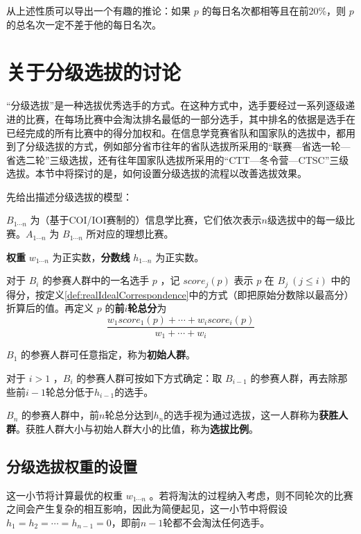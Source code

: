             从上述性质可以导出一个有趣的推论：如果 $p$ 的每日名次都相等且在前20\%，则 $p$ 的总名次一定不差于他的每日名次。

\section{关于分级选拔的讨论}\label{sec:sec6Multilevel}

    “分级选拔”是一种选拔优秀选手的方式。在这种方式中，选手要经过一系列逐级递进的比赛，在每场比赛中会淘汰排名最低的一部分选手，其中排名的依据是选手在已经完成的所有比赛中的得分加权和。在信息学竞赛省队和国家队的选拔中，都用到了分级选拔的方式，例如部分省市往年的省队选拔所采用的“联赛---省选一轮---省选二轮”三级选拔，还有往年国家队选拔所采用的“CTT---冬令营---CTSC”三级选拔。本节中将探讨的是，如何设置分级选拔的流程以改善选拔效果。

    \vspace{1.5ex}

    先给出描述分级选拔的模型：
    \begin{asparaitem}
        \item $B_{1\cdots n}$ 为（基于COI/IOI赛制的）信息学比赛，它们依次表示$n$级选拔中的每一级比赛。$A_{1\cdots n}$ 为 $B_{1\cdots n}$ 所对应的理想比赛。
        \item \textbf{权重} $w_{1\cdots n}$ 为正实数，\textbf{分数线} $h_{1\cdots n}$ 为正实数。
        \item 对于 $B_i$ 的参赛人群中的一名选手 $p$ ，记 $\textit{score}_{j}(p)$ 表示 $p$ 在 $B_j\  (j\leq i)$ 中的得分，按定义\ref{def:realIdealCorrespondence}中的方式（即把原始分数除以最高分）折算后的值。再定义 $p$ 的\textbf{前$i$轮总分}为 $$\frac{w_1\textit{score}_1(p)+\cdots+w_i\textit{score}_i(p)}{w_1+\cdots+w_i}$$
        \item $B_1$ 的参赛人群可任意指定，称为\textbf{初始人群}。
        \item 对于 $i>1$ ，$B_i$ 的参赛人群可按如下方式确定：取 $B_{i-1}$ 的参赛人群，再去除那些前$i-1$轮总分低于$h_{i-1}$的选手。
        \item $B_n$ 的参赛人群中，前$n$轮总分达到$h_n$的选手视为通过选拔，这一人群称为\textbf{获胜人群}。获胜人群大小与初始人群大小的比值，称为\textbf{选拔比例}。
    \end{asparaitem}

    \subsection{分级选拔权重的设置}

        这一小节将计算最优的权重 $w_{1\cdots n}$ 。若将淘汰的过程纳入考虑，则不同轮次的比赛之间会产生复杂的相互影响，因此为简便起见，这一小节中将假设$h_1=h_2=\cdots=h_{n-1}=0$，即前$n-1$轮都不会淘汰任何选手。

